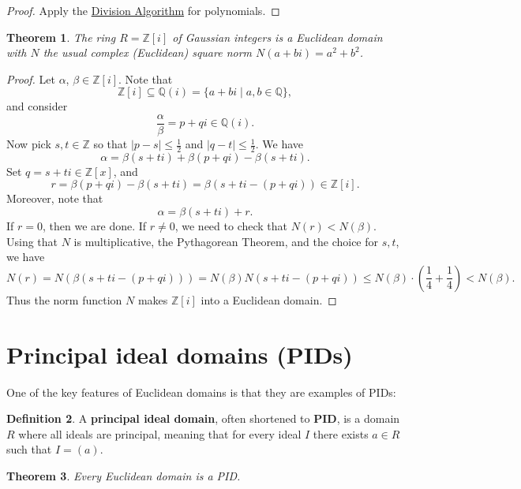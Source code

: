 \documentclass[12pt]{report}
\newtheorem{theorem}{Theorem}[chapter]
\numberwithin{equation}{section}
\numberwithin{theorem}{chapter}
\theoremstyle{definition}
\newtheorem{definition}[theorem]{Definition}
\newtheorem*{basic properties}{Basic Properties}
\newtheorem*{Important Remark}{Important Remark}
\newcommand{\df}[1]{{\bf #1}\index{#1}}
\begin{document}
\begin{proof}
	Apply the \hyperref[division algorithm polynomials]{Division Algorithm} for polynomials.
\end{proof}





\begin{theorem}\label{Z[i] is an euclidean domain}
The ring $R = \mathbb{Z}[i]$ of Gaussian integers is a Euclidean domain with $N$ the usual complex (Euclidean) square norm $N(a+bi)=a^2+b^2$.
\end{theorem}

\begin{proof}
Let $\alpha$, $\beta \in \mathbb{Z}[i]$. Note that
$$\mathbb{Z}[i] \subseteq \mathbb{Q}(i) = \{ a + bi \mid a, b \in \mathbb{Q} \},$$ 
and consider 
$$\frac{\alpha}{\beta}=p+qi \in \mathbb{Q}(i).$$ 
Now pick $s,t\in\mathbb{Z}$ so that $|p-s| \leqslant \frac{1}{2}$ and $|q-t| \leqslant \frac{1}{2}$. We have
$$\alpha = \beta(s+ti)+\beta(p+qi)-\beta(s+ti).$$
Set $q=s+ti \in \mathbb{Z}[x]$, and 
$$r=\beta(p+qi)-\beta(s+ti)=\beta(s+ti-(p+qi)) \in \mathbb{Z}[i].$$
Moreover, note that
$$\alpha = \beta (s+ti) + r.$$ 
If $r=0$, then we are done.
If $r\neq 0$, we need to check that $N(r) < N(\beta)$. Using that $N$ is multiplicative, the Pythagorean Theorem, and the choice for $s,t$, we have
$$N(r)=N(\beta(s+ti-(p+qi)))=N(\beta)N(s+ti-(p+qi))\leqslant N(\beta)\cdot \left( \frac{1}{4}+\frac{1}{4} \right) < N(\beta).$$
Thus the norm function $N$ makes $\mathbb{Z}[i]$ into a Euclidean domain.
\end{proof}



\section{Principal ideal domains (PIDs)}



One of the key features of Euclidean domains is that they are examples of PIDs:


\begin{definition}
	A \df{principal ideal domain}, often shortened to \df{PID}, is a domain $R$ where all ideals are principal, meaning that for every ideal $I$ there exists $a \in R$ such that $I = (a)$.
\end{definition}





\begin{theorem}\label{euclidean domains are pids}
Every Euclidean domain is a PID.
\end{theorem}
\end{document}
